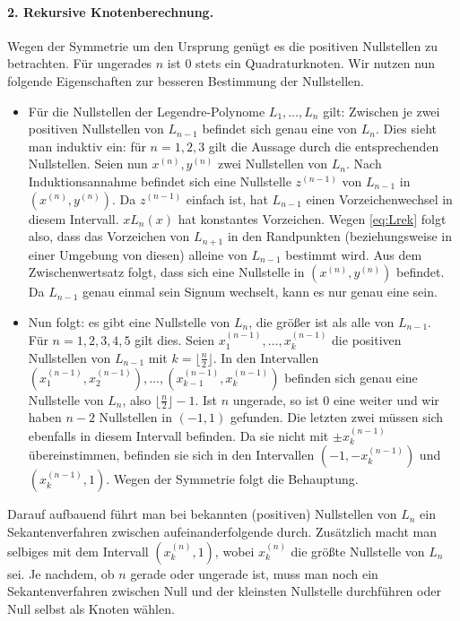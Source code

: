 \documentclass[french, 12pt, a4paper, onesided]{scrartcl}
\theoremstyle{plain}
\theoremstyle{definition}
\theoremstyle{remark}
\begin{document}
\paragraph{2. Rekursive Knotenberechnung.} Wegen der Symmetrie um den Ursprung genügt es die positiven Nullstellen zu betrachten. Für ungerades $ n $ ist $ 0 $ stets ein Quadraturknoten.
\newline
Wir nutzen nun folgende Eigenschaften zur besseren Bestimmung der Nullstellen.
\begin{itemize}
	\item Für die Nullstellen der Legendre-Polynome $ L_1,\ldots,L_n $ gilt: Zwischen je zwei positiven Nullstellen von $ L_{n-1} $ befindet sich genau eine von $ L_n $.
	\newline
	Dies sieht man induktiv ein: für $ n=1,2,3 $ gilt die Aussage durch die entsprechenden Nullstellen. Seien nun $ x^{(n)},y^{(n)} $ zwei Nullstellen von $ L_n $. Nach Induktionsannahme befindet sich eine Nullstelle $ z^{(n-1)} $ von $ L_{n-1} $ in $ (x^{(n)},y^{(n)}) $. Da $ z^{(n-1)} $ einfach ist, hat $ L_{n-1} $ einen Vorzeichenwechsel in diesem Intervall. $ xL_n(x) $ hat konstantes Vorzeichen. Wegen \eqref{eq:Lrek} folgt also, dass das Vorzeichen von $ L_{n+1} $ in den Randpunkten (beziehungsweise in einer Umgebung von diesen) alleine von $ L_{n-1} $ bestimmt wird. Aus dem Zwischenwertsatz folgt, dass sich eine Nullstelle in $ (x^{(n)},y^{(n)}) $ befindet. Da $ L_{n-1} $ genau einmal sein Signum wechselt, kann es nur genau eine sein.
	\item Nun folgt: es gibt eine Nullstelle von $ L_n $, die größer ist als alle von $ L_{n-1} $.
	\\
	Für $ n=1,2,3,4,5 $ gilt dies.
	\newline
	Seien $ x_1^{(n-1)},\ldots,x_k^{(n-1)} $ die positiven Nullstellen von $ L_{n-1} $ mit $ k=\lfloor \frac{n}{2}\rfloor $. In den Intervallen $ (x_1^{(n-1)},x_2^{(n-1)}),\ldots,(x_{k-1}^{(n-1)},x_k^{(n-1)}) $ befinden sich genau eine Nullstelle von $ L_n $, also $ \lfloor \frac{n}{2}\rfloor-1 $. Ist $ n $ ungerade, so ist $ 0 $ eine weiter und wir haben $ n-2 $ Nullstellen in $ (-1,1) $ gefunden. Die letzten zwei müssen sich ebenfalls in diesem Intervall befinden. Da sie nicht mit $ \pm x_k^{(n-1)} $ übereinstimmen, befinden sie sich in den Intervallen $ (-1,-x_k^{(n-1)})  $ und $ (x_k^{(n-1)},1) $. Wegen der Symmetrie folgt die Behauptung.
\end{itemize}
Darauf aufbauend führt man bei bekannten (positiven) Nullstellen von $ L_n $ ein Sekantenverfahren zwischen aufeinanderfolgende durch. Zusätzlich macht man selbiges mit dem Intervall $ (x_k^{(n)},1) $, wobei $ x_k^{(n)} $ die größte Nullstelle von $ L_n $sei. Je nachdem, ob $ n $ gerade oder ungerade ist, muss man noch ein Sekantenverfahren zwischen Null und der kleinsten Nullstelle durchführen oder Null selbst als Knoten wählen.
\end{document}
